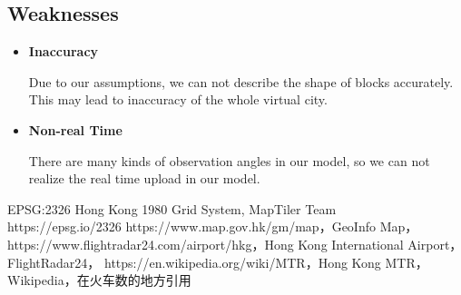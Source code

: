\documentclass[12pt]{article}
\newcommand{\wholepages}{19}
\theoremstyle{definition}
\theoremstyle{remark}
\numberwithin{equation}{section}
\begin{document}
	\subsection*{Weaknesses}
		\begin{itemize}
			\item \textbf{Inaccuracy}
			
			Due to our assumptions, we can not describe the shape of blocks accurately. This may lead to inaccuracy of the whole virtual city.
			\item \textbf{Non-real Time}
			
			There are many kinds of observation angles in our model, so we can not realize the real time upload in our model.
		\end{itemize}
	\newpage
	\thispagestyle{empty}
	\renewcommand\refname{References}
	\clearpage
	\begin{thebibliography}{100}
	EPSG:2326 Hong Kong 1980 Grid System, MapTiler Team\\
	https://epsg.io/2326
	\bibitem{}https://www.map.gov.hk/gm/map，GeoInfo Map，%
	\bibitem{}https://www.flightradar24.com/airport/hkg，Hong Kong International Airport，FlightRadar24，%
	\bibitem{}https://en.wikipedia.org/wiki/MTR，Hong Kong MTR，Wikipedia，在火车数的地方引用
	\end{thebibliography} 
	
\end{document}
